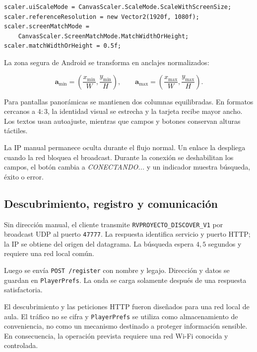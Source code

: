 \begin{lstlisting}[style=csharp, caption={Escalado adaptable del menú.}]
scaler.uiScaleMode = CanvasScaler.ScaleMode.ScaleWithScreenSize;
scaler.referenceResolution = new Vector2(1920f, 1080f);
scaler.screenMatchMode =
    CanvasScaler.ScreenMatchMode.MatchWidthOrHeight;
scaler.matchWidthOrHeight = 0.5f;
\end{lstlisting}

La zona segura de Android se transforma en anclajes normalizados:

\begin{equation}
\boldsymbol{a}_{\min}=\left(\frac{x_{\min}}{W},\frac{y_{\min}}{H}\right),
\qquad
\boldsymbol{a}_{\max}=\left(\frac{x_{\max}}{W},\frac{y_{\max}}{H}\right).
\end{equation}

Para pantallas panorámicas se mantienen dos columnas equilibradas. En formatos
cercanos a $4:3$, la identidad visual se estrecha y la tarjeta recibe mayor ancho.
Los textos usan autoajuste, mientras que campos y botones conservan alturas táctiles.

La IP manual permanece oculta durante el flujo normal. Un enlace la despliega cuando
la red bloquea el broadcast. Durante la conexión se deshabilitan los campos, el botón
cambia a \textit{CONECTANDO...} y un indicador muestra búsqueda, éxito o error.

\subsection{Descubrimiento, registro y comunicación}

Sin dirección manual, el cliente transmite
\texttt{RVPROYECTO\_DISCOVER\_V1} por broadcast UDP al puerto \texttt{47777}. La
respuesta identifica servicio y puerto HTTP; la IP se obtiene del origen del datagrama.
La búsqueda espera $4{,}5$ segundos y requiere una red local común.

Luego se envía \texttt{POST /register} con nombre y legajo. Dirección y datos se
guardan en \texttt{PlayerPrefs}. La onda se carga solamente después de una respuesta
satisfactoria.

El descubrimiento y las peticiones HTTP fueron diseñados para una red local de aula.
El tráfico no se cifra y \texttt{PlayerPrefs} se utiliza como almacenamiento de
conveniencia, no como un mecanismo destinado a proteger información sensible. En
consecuencia, la operación prevista requiere una red Wi-Fi conocida y controlada.

